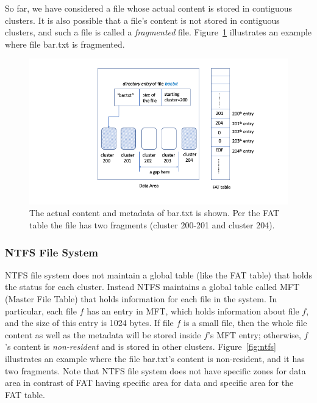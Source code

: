 So far, we have considered a file whose actual content is stored in contiguous clusters. 
It is also possible that a file's content is not stored in contiguous clusters, and such a file is 
called a \emph{fragmented} file. Figure~\ref{fig:fat3} illustrates an example where file bar.txt is fragmented.

 \begin{figure}[h]
     \centering
     \includegraphics[width=\linewidth]{fig/fat3.png}
     \caption{The actual content and metadata of bar.txt is shown. Per the FAT table the file has two fragments (cluster 200-201 and cluster 204).}
     \label{fig:fat3}
 \end{figure}



\subsubsection{NTFS File System} \label{subsubsec:ntfs-overview}

NTFS file system does not maintain a global table (like the FAT table) 
that holds the status for each cluster. Instead NTFS maintains a global table called 
MFT (Master File Table) that
holds information for each file in the system. In particular, each file $f$ has an 
entry in MFT, which holds information about file $f$, and the size of this entry is 1024 bytes.  
If file $f$ is a small file, then the whole file content as well as the metadata will be stored
inside $f$'s MFT entry; 
otherwise, $f$'s content is \emph{non-resident} and is stored in other clusters. 
Figure~\ref{fig:ntfs} illustrates an example where the file bar.txt's content is non-resident, 
and it has two fragments.
Note that NTFS file system does not have specific zones for data area in contrast of 
FAT having specific area for data and specific area for the FAT table.


